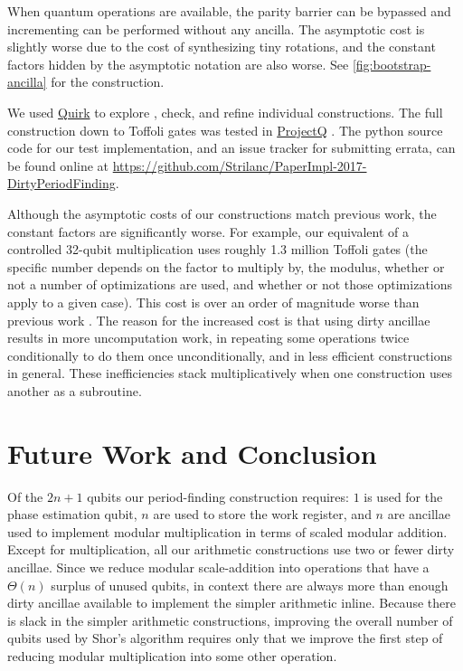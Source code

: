 \documentclass[twocolumn,longbibliography]{quantumarticle}
\begin{document}
When quantum operations are available, the parity barrier can be bypassed and incrementing can be performed without any ancilla.
The asymptotic cost is slightly worse due to the cost of synthesizing tiny rotations, and the constant factors hidden by the asymptotic notation are also worse.
See \autoref{fig:bootstrap-ancilla} for the construction.

We used \href{https://github.com/Strilanc/Quirk}{Quirk} \cite{quirk2016} to explore \cite{victor2013}, check, and refine individual constructions.
The full construction down to Toffoli gates was tested in \href{https://github.com/ProjectQ-Framework/ProjectQ}{ProjectQ} \cite{projq2016}.
The python source code for our test implementation, and an issue tracker for submitting errata, can be found online at \href{https://github.com/Strilanc/PaperImpl-2017-DirtyPeriodFinding}{https://github.com/Strilanc/PaperImpl-2017-DirtyPeriodFinding}.

Although the asymptotic costs of our constructions match previous work, the constant factors are significantly worse.
For example, our equivalent of a controlled 32-qubit multiplication uses roughly 1.3 million Toffoli gates (the specific number depends on the factor to multiply by, the modulus, whether or not a number of optimizations are used, and whether or not those optimizations apply to a given case).
This cost is over an order of magnitude worse than previous work \cite{haner2016}.
The reason for the increased cost is that using dirty ancillae results in more uncomputation work, in repeating some operations twice conditionally to do them once unconditionally, and in less efficient constructions in general.
These inefficiencies stack multiplicatively when one construction uses another as a subroutine.


\section{Future Work and Conclusion} \label{sec:conclusion}

Of the $2n+1$ qubits our period-finding construction requires: $1$ is used for the phase estimation qubit, $n$ are used to store the work register, and $n$ are ancillae used to implement modular multiplication in terms of scaled modular addition.
Except for multiplication, all our arithmetic constructions use two or fewer dirty ancillae.
Since we reduce modular scale-addition into operations that have a $\Theta(n)$ surplus of unused qubits, in context there are always more than enough dirty ancillae available to implement the simpler arithmetic inline.
Because there is slack in the simpler arithmetic constructions, improving the overall number of qubits used by Shor's algorithm requires only that we improve the first step of reducing modular multiplication into some other operation.
\end{document}
